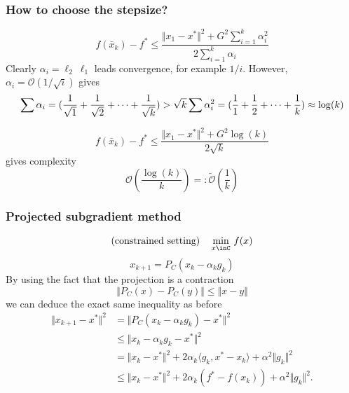 \documentclass{beamer}
\begin{document}
\begin{frame}
  \frametitle{How to choose the stepsize?}
  \begin{equation}
    f(\bar{x}_k) - f^* \le \frac{\Vert x_1-x^*\Vert^2 + G^2 \sum_{i=1}^{k}\alpha_i^2}{2 \sum_{i=1}^{k}\alpha_i}
  \end{equation}
  Clearly $\alpha_i = \ell_2\ \ell_1$ leads convergence, for example $1/i$.
  However, $\alpha_i = \mathcal{O}(1/\sqrt{i})$ gives
  \begin{equation}
    \sum \alpha_i = (\frac{1}{\sqrt{1}} + \frac{1}{\sqrt{2}} + \cdots +  \frac{1}{\sqrt{k}}) > \sqrt{k}\\
    \sum \alpha_i^2 = (\frac{1}{1} + \frac{1}{2} + \cdots + \frac{1}{k}) \approx \log(k)
  \end{equation}

  \begin{equation}
    f(\bar{x}_k) - f^* \le \frac{\Vert x_1-x^*\Vert^2 + G^2 \log(k)}{2 \sqrt{k}}
  \end{equation}
  gives complexity
  \begin{equation}
    \mathcal{O}\left(\frac{\log(k)}{k}\right) =: \tilde{\mathcal{O}}\left(\frac{1}{k}\right)
  \end{equation}

\end{frame}


\begin{frame}
  \frametitle{Projected subgradient method}
  \begin{equation}
    \text{(constrained setting)} \quad \min_{x\inC}\, f(x)
  \end{equation}
  \begin{equation}
    x_{k+1} = P_C( x_k- \alpha_k g_k )
  \end{equation}
  By using the fact that the projection is a contraction
  \begin{equation}
    \Vert P_C(x) - P_C(y) \Vert \le \Vert x-y \Vert
  \end{equation}
  we can deduce the exact same inequality as before
  \begin{equation}
    \begin{aligned}
      \Vert x_{k+1} - x^* \Vert^2 &= \Vert P_C(x_k - \alpha_k g_k) - x^* \Vert^2 \\
      &\le \Vert x_k - \alpha_k g_k - x^* \Vert^2 \\
      &= \Vert x_k-x^* \Vert^2 + 2 \alpha_k \langle g_k, x^*-x_k \rangle + \alpha^2 \Vert g_k \Vert^2\\
      &\le \Vert x_k-x^* \Vert^2 + 2 \alpha_k (f^* - f(x_k))+ \alpha^2 \Vert g_k \Vert^2.
    \end{aligned}
  \end{equation}
\end{frame}
\end{document}
